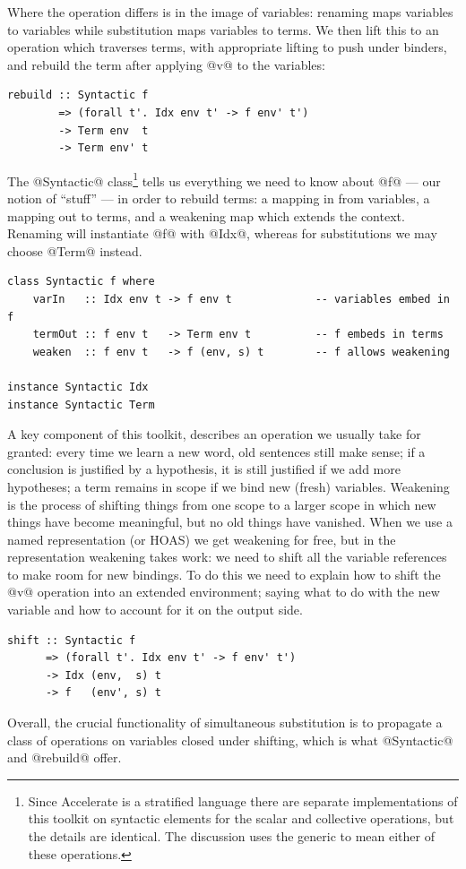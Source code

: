 Where the operation differs is in the image of variables: renaming maps
variables to variables while substitution maps variables to terms. We then lift
this to an operation which traverses terms, with appropriate lifting to push
under binders, and rebuild the term after applying @v@ to the variables:
%
\begin{lstlisting}[style=haskell]
rebuild :: Syntactic f
        => (forall t'. Idx env t' -> f env' t')
        -> Term env  t
        -> Term env' t
\end{lstlisting}

The @Syntactic@ class\footnote{Since Accelerate is a stratified
language\lang[stratified]{} there are separate implementations of this toolkit
on syntactic elements for the scalar and collective operations, but the details
are identical. The discussion uses the generic  to mean either of
these operations.} tells us everything we need to know about @f@ --- our notion
of ``stuff'' --- in order to rebuild terms: a mapping in from variables, a
mapping out to terms, and a weakening map which extends the context. Renaming
will instantiate @f@ with @Idx@, whereas for substitutions we may choose @Term@
instead.
%
\begin{lstlisting}[style=haskell]
class Syntactic f where
    varIn   :: Idx env t -> f env t             -- variables embed in f
    termOut :: f env t   -> Term env t          -- f embeds in terms
    weaken  :: f env t   -> f (env, s) t        -- f allows weakening

instance Syntactic Idx
instance Syntactic Term
\end{lstlisting}

A key component of this toolkit,  describes an operation we
usually take for granted: every time we learn a new word, old sentences still
make sense; if a conclusion is justified by a hypothesis, it is still justified
if we add more hypotheses; a term remains in scope if we bind new (fresh)
variables. Weakening is the process of shifting things from one scope to a
larger scope in which new things have become meaningful, but no old things have
vanished. When we use a named representation (or HOAS\HOAS{}) we get weakening
for free, but in the  representation weakening takes
work: we need to shift all the variable references to make room for new
bindings. To do this we need to explain how to shift the @v@ operation into
an extended environment; saying what to do with the new variable and how to
account for it on the output side.
%
\begin{lstlisting}[style=haskell]
shift :: Syntactic f
      => (forall t'. Idx env t' -> f env' t')
      -> Idx (env,  s) t
      -> f   (env', s) t
\end{lstlisting}
%
Overall, the crucial functionality of simultaneous substitution is to propagate
a class of operations on variables closed under shifting, which is what
@Syntactic@ and @rebuild@ offer.



